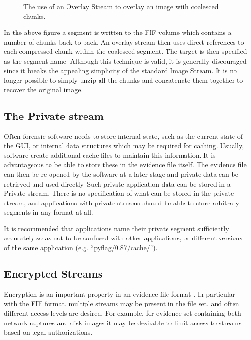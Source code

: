 \documentclass[10pt, conference]{IEEEtran}
\begin{document}
\begin{figure}[tb]
  \begin{center}
  \mbox{\columnwidth {}}
  \caption{The use of an Overlay Stream to overlay an image with
coalesced chunks.}
  \label{overlay}
  \end{center}
\end{figure}

In the above figure a segment is written to the FIF volume which
contains a number of chunks back to back. An overlay stream then uses
direct references to each compressed chunk within the coalesced
segment. The target is then specified as the segment name. Although
this technique is valid, it is generally discouraged since it breaks
the appealing simplicity of the standard Image Stream.  It is no
longer possible to simply unzip all the chunks and concatenate them
together to recover the original image.


\subsection{The Private stream}
Often forensic software needs to store internal state, such as the
current state of the GUI, or internal data structures which may be
required for caching. Usually, software create additional cache files
to maintain this information. It is advantageous to be able to store
these in the evidence file itself. The evidence file can then be
re-opened by the software at a later stage and private data can be
retrieved and used directly. Such private application data can be
stored in a Private stream. There is no specification of what can be
stored in the private stream, and applications with private streams
should be able to store arbitrary segments in any format at all.

It is recommended that applications name their private segment
sufficiently accurately so as not to be confused with other
applications, or different versions of the same application
(e.g. ``pyflag/0.87/cache/'').

\subsection{Encrypted Streams}
Encryption is an important property in an evidence file format
\cite{AFF}. In particular with the FIF format, multiple streams may be
present in the file set, and often different access levels are
desired. For example, for evidence set containing both network
captures and disk images it may be desirable to limit access to
streams based on legal authorizations.
\end{document}
